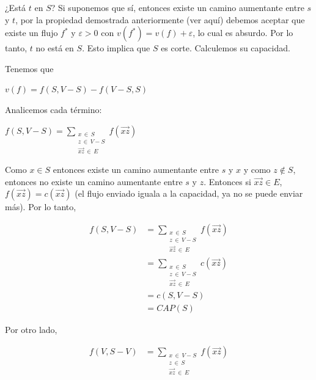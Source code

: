 \documentclass[10pt,a4paper]{article}
\begin{document}
¿Está $t$ en $S$? Si suponemos que sí, entonces existe un camino aumentante entre $s$ y $t$, por la propiedad demostrada anteriormente (ver aquí) debemos aceptar que existe un flujo $f^*$ y $\varepsilon > 0$ con $v(f^*) = v(f) + \varepsilon$, lo cual es absurdo. Por lo tanto, $t$ no está en $S$. Esto implica que $S$ es corte. Calculemos su capacidad.

Tenemos que

\begin{center}
$v(f) = f(S, V- S)-f(V-S, S)$
\end{center}

Analicemos cada término:

\begin{center}
$f(S, V- S) = \sum\limits_{\substack{x \,\in \, S\\z \,\in\,V-S\\ \overrightarrow{xz} \,\in\,E}}f(\overrightarrow{xz})$
\end{center}

Como $x \in S$ entonces existe un camino aumentante entre $s$ y $x$ y como $z\not \in S$, entonces no existe un camino aumentante entre $s$ y $z$. Entonces si $\overrightarrow{xz} \in E$, $f(\overrightarrow{xz}) = c(\overrightarrow{xz})$ (el flujo enviado iguala a la capacidad, ya no se puede enviar más). Por lo tanto,

\begin{center}
\begin{align*} f(S, V- S) &= \sum\limits_{\substack{x \,\in \, S\\z \,\in\,V-S\\ \overrightarrow{xz} \,\in\,E}}f(\overrightarrow{xz})\\ &= \sum\limits_{\substack{x \,\in \, S\\z \,\in\,V-S\\ \overrightarrow{xz} \,\in\,E}}c(\overrightarrow{xz})\\ &= c(S, V-S)\\ &= CAP(S) \end{align*}
\end{center}

Por otro lado,

\begin{center}
\begin{align*} f(V, S-V) &= \sum\limits_{\substack{x\,\in\,V -S\\ z \,\in\,S\\ \overrightarrow{xz} \,\in\,E}}f(\overrightarrow{xz})\\ \end{align*}
\end{center}
\end{document}
